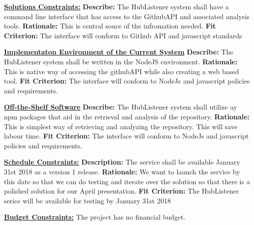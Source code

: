 \documentclass{article}
\begin{document}
\noindent
\textbf{\underline{Solutions Constraints:}}\newline
\textbf{Describe:}  The HubListener system shall have a command line interface that has access to the GithubAPI and associated analysis tools.\newline
\textbf{Rationale:} This is central souce of the infromation needed. \newline
\textbf{Fit Criterion:}  The interface will conform to Github API and javascript standards \newline

\noindent
\textbf{\underline{Implementaton Environment of the Current System}}\newline
\textbf{Describe:}  The HubListener system shall be written in the NodeJS environment.\newline
\textbf{Rationale:} This is native way of accessing the githubAPI while also creating a web based tool.\newline 
\textbf{Fit Criterion:}  The interface will conform to NodeJs and javascript policies and requirements. \newline

\noindent
\textbf{\underline{Off-the-Shelf Software}}\newline
\textbf{Describe:}  The HubListener system shall utilize ay npm packages that aid in the retrieval and analysis of the repository. \newline
\textbf{Rationale:}  This is simplest way of retrieving and analyzing the repository. This will save labour time.\newline
\textbf{Fit Criterion:}  The interface will conform to NodeJs and javascript policies and requirements. \newline

\noindent
\textbf{\underline{Schedule Constraints:}}\newline
\textbf{Description:} The service shall be available January 31st 2018 as a version 1 release.\newline
\textbf{Rationale:} We want to launch the service by this date so that we can do testing and iterate over the solution so that there is a polished solution for our April presentation.\newline
\textbf{Fit Criterion:} The HubListener serice will be available for testing by January 31st 2018 \newline

\noindent
\textbf{\underline{Budget Constraints:}} 
The project has no financial budget. 
\end{document}
